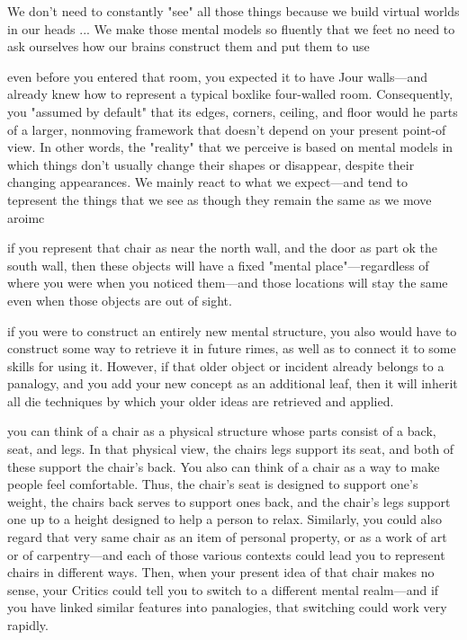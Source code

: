 \documentclass[10pt,a4paper]{article}
\begin{document}
We don't need to constantly "see" all those things because we build virtual worlds in our heads
...
We make those mental models so fluently that we feet no need to ask ourselves how our brains construct them and put them to use \cite[p.~263-264]{minsky}

even before you entered that room, you expected it to have Jour walls—and already knew how to represent a typical boxlike four-walled room. Consequently, you "assumed by default" that its edges, corners, ceiling, and floor would he parts of a larger, nonmoving framework that doesn't depend on your present point-of view. In other words, the "reality" that we perceive is based on mental models in which things don't usually change their shapes or disappear, despite their changing appearances. We mainly react to what we expect—and tend to tepresent the things that we see as though they remain the same as we move aroimc \cite[p.~264]{minsky}

if you represent that chair as near the north wall, and the door as part ok the south wall, then these objects will have a fixed "mental place"—regardless of where you were when you noticed them—and those locations will stay the same even when those objects are out of sight. \cite[p.~265]{minsky}

if you were to construct an entirely new mental structure, you also would have to construct some way to retrieve it in future rimes, as well as to connect it to some skills for using it. However, if that older object or incident already belongs to a panalogy, and you add your new concept as an additional leaf, then it will inherit all die techniques by which your older ideas are retrieved and applied. \cite[p.~265]{minsky}

you can think of a chair as a physical structure whose parts consist of a back, seat, and legs. In that physical view, the chairs legs support its seat, and both of these support the chair's back. You also can think of a chair as a way to make people feel comfortable. Thus, the chair's seat is designed to support one's weight, the chairs back serves to support ones back, and the chair's legs support one up to a height designed to help a person to relax.
Similarly, you could also regard that very same chair as an item of personal property, or as a work of art or of carpentry—and each of those various contexts could lead you to represent chairs in different ways. Then, when your present idea of that chair makes no sense, your Critics could tell you to switch to a different mental realm—and if you have linked similar features into panalogies, that switching could work very rapidly. \cite[p.~265-266]{minsky}
\end{document}
